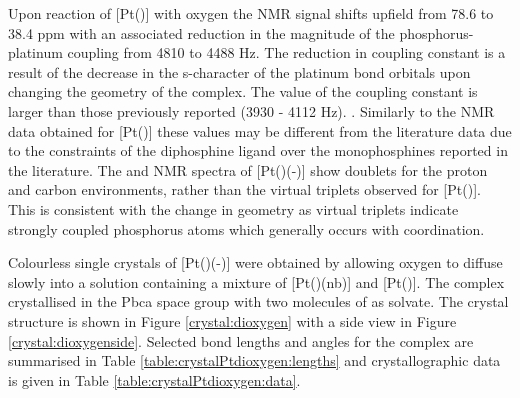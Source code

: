 Upon reaction of [Pt(\tButhixantphos)] with oxygen the \phosphorus{} NMR signal shifts upfield from 78.6 to 38.4 ppm with an associated reduction in the magnitude of the phosphorus-platinum coupling from 4810 to 4488 Hz.  The reduction in coupling constant is a result of the decrease in the s-character of the platinum bond orbitals upon changing the geometry of the complex.\cite{Pregosin2012}  The value of the \JPtP{} coupling constant is larger than those previously reported (3930 - 4112 Hz).\cite{Goel1983b} .  Similarly to the NMR data obtained for [Pt(\tButhixantphos)] these values may be different from the literature data due to the constraints of the diphosphine ligand over the monophosphines reported in the literature.  The \proton{} and \carbon{} NMR spectra of [Pt(\tButhixantphos)(-)] show doublets for the \tBu{} proton and carbon environments, rather than the virtual triplets observed for [Pt(\tButhixantphos)].  This is consistent with the change in geometry as virtual triplets indicate strongly coupled phosphorus atoms which generally occurs with\trans{} coordination.\cite{Harris1964}

Colourless single crystals of [Pt(\tButhixantphos)(-)] were obtained by allowing oxygen to diffuse slowly into a  solution containing a mixture of [Pt(\tButhixantphos)(nb)] and [Pt(\tButhixantphos)].  The complex crystallised in the Pbca space group with two molecules of  as solvate.  The crystal structure is shown in Figure \ref{crystal:dioxygen} with a side view in Figure \ref{crystal:dioxygenside}.  Selected bond lengths and angles for the complex are summarised in Table \ref{table:crystalPtdioxygen:lengths} and crystallographic data is given in Table \ref{table:crystalPtdioxygen:data}.  

